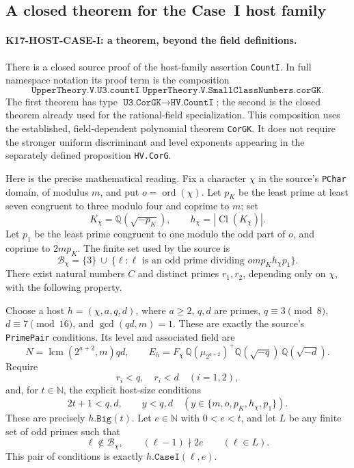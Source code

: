 \subsection{A closed theorem for the Case~I host family}
\label{sec:host-case-one}

\paragraph{K17-HOST-CASE-I: a theorem, beyond the field definitions.}
There is a closed source proof of the host-family assertion
\texttt{CountI}.  In full namespace notation its proof term is the
composition
\[
 \texttt{UpperTheory.V.U3.countI}\;
 \texttt{UpperTheory.V.SmallClassNumbers.corGK}.
\]
The first theorem has type
\(\texttt{U3.CorGK}\longrightarrow\texttt{HV.CountI}\);
the second is the closed theorem already used for the rational-field
specialization.  This composition uses the established, field-dependent
polynomial theorem \texttt{CorGK}.  It does not require the stronger
uniform discriminant and level exponents appearing in the separately
defined proposition \texttt{HV.CorG}.

Here is the precise mathematical reading.  Fix a character \(\chi\) in
the source's \texttt{PChar} domain, of modulus \(m\), and put
\(o=\operatorname{ord}(\chi)\).
Let \(p_K\) be the least prime at least seven congruent to three modulo
four and coprime to \(m\); set
\[
 K_\chi=\mathbb Q(\sqrt{-p_K}),\qquad
 h_\chi=|\operatorname{Cl}(K_\chi)|.
\]
Let \(p_1\) be the least prime congruent to one modulo the odd part of
\(o\), and coprime to \(2mp_K\).  The finite set used by the source is
\[
 \mathcal B_\chi=\{3\}\ \cup\
 \{\ell:\ell\text{ is an odd prime dividing }omp_Kh_\chi p_1\}.
\]
There exist natural numbers \(C\) and distinct primes \(r_1,r_2\),
depending only on \(\chi\), with the following property.

Choose a host \(h=(\chi,a,q,d)\), where \(a\ge2\), \(q,d\) are primes,
\(q\equiv3\pmod8\), \(d\equiv7\pmod{16}\), and
\(\gcd(qd,m)=1\).  These are exactly the source's
\texttt{PrimePair} conditions.  Its level and associated field are
\[
 N=\operatorname{lcm}(2^{a+2},m)qd,
 \qquad
 E_h=F_\chi\,\mathbb Q(\mu_{2^{a+2}})^+
          \mathbb Q(\sqrt{-q})\,\mathbb Q(\sqrt{-d}).
\]
Require
\[
 r_i<q,\quad r_i<d\quad(i=1,2),
\]
and, for \(t\in\mathbb N\), the explicit host-size conditions
\[
 2t+1<q,d,
 \qquad y<q,d\quad
 (y\in\{m,o,p_K,h_\chi,p_1\}).
\]
These are precisely \(h.\texttt{Big}(t)\).  Let \(e\in\mathbb N\) with \(0<e<t\), and let
\(L\) be any finite set of odd primes such that
\[
 \ell\notin\mathcal B_\chi,
 \qquad (\ell-1)\nmid 2e
 \qquad(\ell\in L).
\]
This pair of conditions is exactly \(h.\texttt{CaseI}(\ell,e)\).

